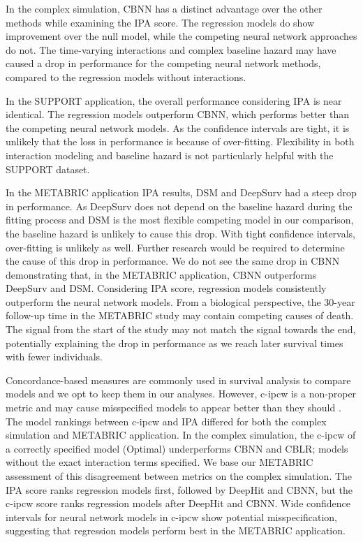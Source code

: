 \documentclass[AMA,STIX1COL,]{WileyNJD-v2}
\begin{document}
In the complex simulation, CBNN has a distinct advantage over the other
methods while examining the IPA score. The regression models do show
improvement over the null model, while the competing neural network
approaches do not. The time-varying interactions and complex baseline
hazard may have caused a drop in performance for the competing neural
network methods, compared to the regression models without interactions.

In the SUPPORT application, the overall performance considering IPA is
near identical. The regression models outperform CBNN, which performs
better than the competing neural network models. As the confidence
intervals are tight, it is unlikely that the loss in performance is
because of over-fitting. Flexibility in both interaction modeling and
baseline hazard is not particularly helpful with the SUPPORT dataset.

In the METABRIC application IPA results, DSM and DeepSurv had a steep
drop in performance. As DeepSurv does not depend on the baseline hazard
during the fitting process and DSM is the most flexible competing model
in our comparison, the baseline hazard is unlikely to cause this drop.
With tight confidence intervals, over-fitting is unlikely as well.
Further research would be required to determine the cause of this drop
in performance. We do not see the same drop in CBNN demonstrating that,
in the METABRIC application, CBNN outperforms DeepSurv and DSM.
Considering IPA score, regression models consistently outperform the
neural network models. From a biological perspective, the 30-year
follow-up time in the METABRIC study may contain competing causes of
death. The signal from the start of the study may not match the signal
towards the end, potentially explaining the drop in performance as we
reach later survival times with fewer individuals.

Concordance-based measures are commonly used in survival analysis to
compare models and we opt to keep them in our analyses. However, c-ipcw
is a non-proper metric and may cause misspecified models to appear
better than they should \citep{cindexfails2019}. The model rankings
between c-ipcw and IPA differed for both the complex simulation and
METABRIC application. In the complex simulation, the c-ipcw of a
correctly specified model (Optimal) underperforms CBNN and CBLR; models
without the exact interaction terms specified. We base our METABRIC
assessment of this disagreement between metrics on the complex
simulation. The IPA score ranks regression models first, followed by
DeepHit and CBNN, but the c-ipcw score ranks regression models after
DeepHit and CBNN. Wide confidence intervals for neural network models in
c-ipcw show potential misspecification, suggesting that regression
models perform best in the METABRIC application.
\end{document}

